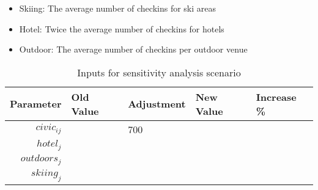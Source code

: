 \begin{itemize}
\item Skiing: The average number of checkins for ski areas
\item Hotel: Twice the average number of checkins for hotels
\item Outdoor: The average number of checkins per outdoor venue
\end{itemize}

\begin{table}[H]
\centering
\caption{Inputs for sensitivity analysis scenario}
\label{table:scenario-inputs}
\begin{tabular}{@{}rllll@{}}
  \toprule
 Parameter & Old Value & Adjustment & New Value & Increase \% \\ \midrule
  $civic_{ij}$ &  & 700 &  & \\ 
  $hotel_j$ &  &  &  & \\ 
  $outdoors_j$  &  &  &  \\ 
  $skiing_j$   &  &  & \\ 
   \bottomrule
\end{tabular}
\end{table}





